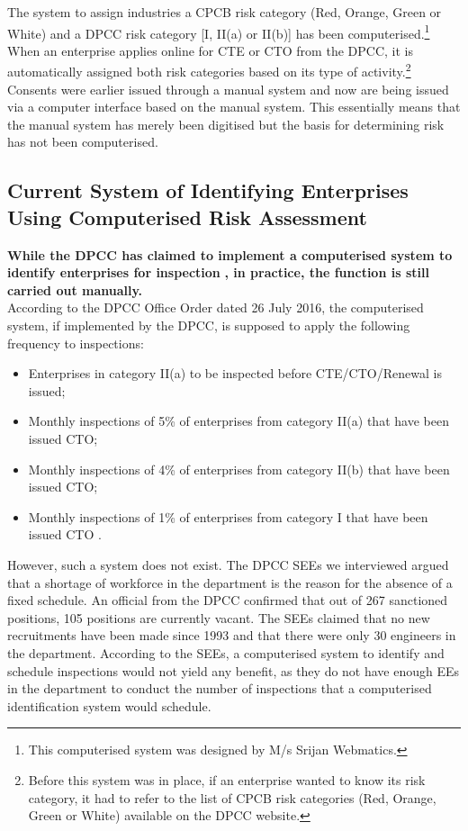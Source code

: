 \documentclass[a4paper, 12pt, twoside]{article}
\begin{document}
                 
                 The system to assign industries a CPCB risk category (Red, Orange, Green or White) and a DPCC risk category [I, II(a) or II(b)] has been computerised.\footnote{This computerised system was designed by M/s Srijan Webmatics.} When an enterprise applies online for CTE or CTO from the DPCC, it is automatically assigned both risk categories based on its type of activity.\footnote{Before this system was in place, if an enterprise wanted to know its risk category, it had to refer to the list of CPCB risk categories (Red, Orange, Green or White) available on the DPCC website.} Consents were earlier issued through a manual system and now are being issued via a computer interface based on the manual system. This essentially means that the manual system has merely been digitised but the basis for determining risk has not been computerised. 
	\subsection{Current System of Identifying Enterprises Using Computerised Risk Assessment}
	
	\textbf{While the DPCC has claimed to implement a computerised system to identify enterprises for inspection} \parencite{DIPPb}\textbf{, in practice, the function is still carried out manually.} \\
	
	According to the DPCC Office Order dated 26 July 2016, the computerised system, if implemented by the DPCC, is supposed to apply the following frequency to inspections: 
	
	\begin{itemize}
	\item{Enterprises in category II(a) to be inspected before CTE/CTO/Renewal is issued;}
	\item{Monthly inspections of 5\% of enterprises from category II(a) that have been issued CTO;}
	\item{Monthly inspections of 4\% of enterprises from category II(b) that have been issued CTO;}
	\item{Monthly inspections of 1\% of enterprises from category I that have been issued CTO \parencite{DPCCb}.}
	\end{itemize} 
	
	However, such a system does not exist. The DPCC SEEs we interviewed argued that a shortage of workforce in the department is the reason for the absence of a fixed schedule. An official from the DPCC confirmed that out of 267 sanctioned positions, 105 positions are currently vacant. The SEEs claimed that no new recruitments have been made since 1993 and that there were only 30 engineers in the department. According to the SEEs, a computerised system to identify and schedule inspections would not yield any benefit, as they do not have enough EEs in the department to conduct the number of inspections that a computerised identification system would schedule. \\
	
\end{document}
